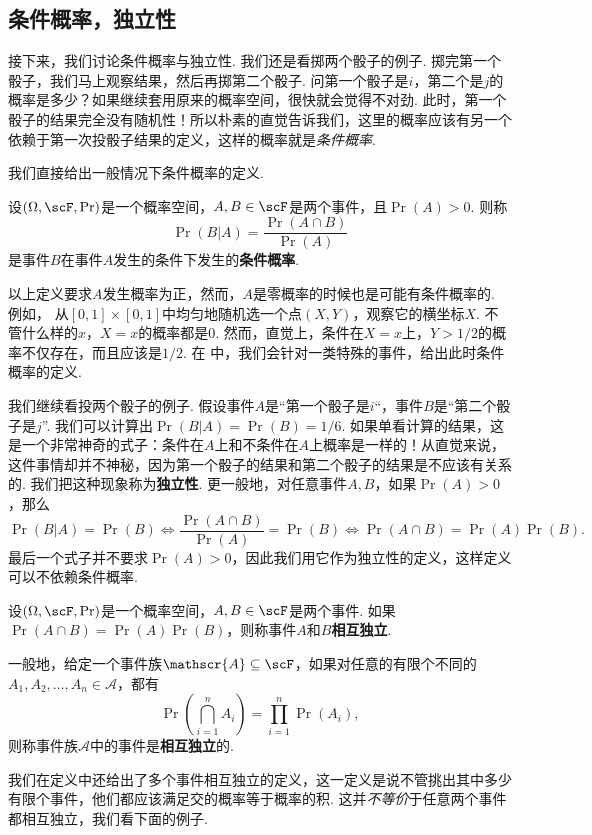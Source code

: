 \subsection{条件概率，独立性}
接下来，我们讨论条件概率与独立性. 我们还是看掷两个骰子的例子. 掷完第一个骰子，我们马上观察结果，然后再掷第二个骰子. 问第一个骰子是$i$，第二个是$j$的概率是多少？如果继续套用原来的概率空间，很快就会觉得不对劲. 此时，第一个骰子的结果完全没有随机性！所以朴素的直觉告诉我们，这里的概率应该有另一个依赖于第一次投骰子结果的定义，这样的概率就是\emph{条件概率}. 

我们直接给出一般情况下条件概率的定义. 

\begin{definition}[条件概率]
设$(\Omega,\scF,\Pr)$是一个概率空间，$A,B\in\scF$是两个事件，且$\Pr(A)>0$. 则称
\[
    \Pr(B|A) = \frac{\Pr(A\cap B)}{\Pr(A)}
\]
是事件$B$在事件$A$发生的条件下发生的\textbf{条件概率}. 
\end{definition}

以上定义要求$A$发生概率为正，然而，$A$是零概率的时候也是可能有条件概率的. 例如，
从$[0,1]\times[0,1]$中均匀地随机选一个点$(X,Y)$，观察它的横坐标$X$. 不管什么样的$x$，$X=x$的概率都是$0$. 然而，直觉上，条件在$X=x$上，$Y>1/2$的概率不仅存在，而且应该是$1/2$. 在 中，我们会针对一类特殊的事件，给出此时条件概率的定义. 

我们继续看投两个骰子的例子. 假设事件$A$是“第一个骰子是$i$“，事件$B$是“第二个骰子是$j$”. 我们可以计算出$\Pr(B|A)=\Pr(B)=1/6$. 如果单看计算的结果，这是一个非常神奇的式子：条件在$A$上和不条件在$A$上概率是一样的！从直觉来说，这件事情却并不神秘，因为第一个骰子的结果和第二个骰子的结果是不应该有关系的. 我们把这种现象称为\textbf{独立性}. 更一般地，对任意事件$A,B$，如果$\Pr(A)>0$，那么
\[\Pr(B|A)=\Pr(B)\iff \frac{\Pr(A\cap B)}{\Pr(A)}=\Pr(B)\iff \Pr(A\cap B)=\Pr(A)\Pr(B).\]
最后一个式子并不要求$\Pr(A)>0$，因此我们用它作为独立性的定义，这样定义可以不依赖条件概率. 

\begin{definition}[独立性]
设$(\Omega,\scF,\Pr)$是一个概率空间，$A,B\in\scF$是两个事件. 如果$\Pr(A\cap B)=\Pr(A)\Pr(B)$，则称事件$A$和$B$\textbf{相互独立}. 

一般地，给定一个事件族$\mathscr{A}\subseteq\scF$，如果对任意的有限个不同的$A_1,A_2,\ldots,A_n\in\mathscr{A}$，都有
\[
    \Pr\left(\bigcap_{i=1}^n A_i\right) = \prod_{i=1}^n \Pr(A_i),
\]
则称事件族$\mathscr{A}$中的事件是\textbf{相互独立}的. 
\end{definition}

我们在定义中还给出了多个事件相互独立的定义，这一定义是说不管挑出其中多少有限个事件，他们都应该满足交的概率等于概率的积. 这并\emph{不等价}于任意两个事件都相互独立，我们看下面的例子. 

